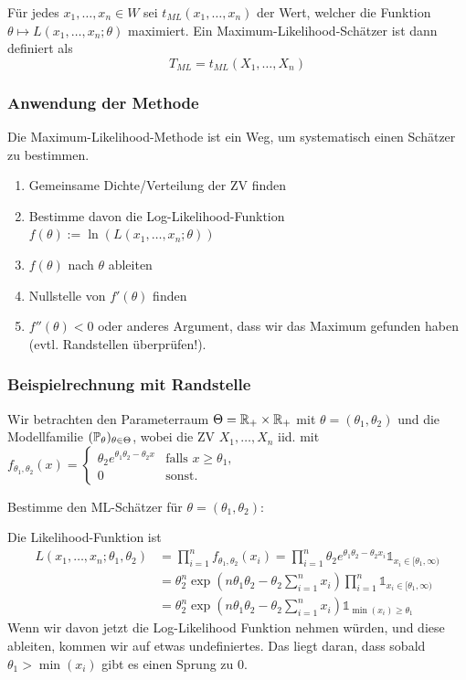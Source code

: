 \noindent Für jedes \(x_1, \ldots, x_n \in W\) sei \(t_{ML}(x_1, \ldots, x_n)\) der Wert, welcher die Funktion \(\theta \mapsto L(x_1, \ldots, x_n; \theta)\) maximiert. Ein Maximum-Likelihood-Schätzer ist dann definiert als
\[T_{ML} = t_{ML}(X_1, \ldots, X_n)\]

\subsubsection{Anwendung der Methode}
Die Maximum-Likelihood-Methode ist ein Weg, um systematisch einen Schätzer zu bestimmen.
\begin{enumerate}
	\item Gemeinsame Dichte/Verteilung der ZV finden
	\item Bestimme davon die Log-Likelihood-Funktion\\ \(f(\theta) := \ln(L(x_1, \ldots, x_n;\theta))\)
	\item \(f(\theta)\) nach \(\theta\) ableiten
	\item Nullstelle von \(f'(\theta)\) finden
	\item $f''(\theta) < 0$ oder anderes Argument, dass wir das Maximum gefunden haben (evtl. Randstellen überprüfen!).
\end{enumerate}

\subsubsection*{Beispielrechnung mit Randstelle}
Wir betrachten den Parameterraum $\Theta = \R_+ \times \R_+$ mit $\theta = (\theta_1, \theta_2)$ und die Modellfamilie $(\P_\theta)_{\theta\in \Theta}$, wobei die ZV $X_1, \ldots, X_n$ iid. mit $f_{\theta_1, \theta_2}(x) = \begin{cases}
    \theta_2e^{\theta_1\theta_2 - \theta_2x} & \text{falls }x \geq \theta_1,\\
    0 & \text{sonst.}
\end{cases}$

Bestimme den ML-Schätzer für $\theta = (\theta_1, \theta_2)$:

Die Likelihood-Funktion ist 
\begin{align*}
    L(x_1, \dots, x_n; \theta_1, \theta_2) &= \prod_{i = 1}^{n}f_{\theta_1, \theta_2}(x_i) = \prod_{i = 1}^n \theta_2e^{\theta_1\theta_2 - \theta_2 x_i} \mathds{1}_{x_i \in [\theta_1, \infty)}\\
    &= \theta_2^n \exp\left(n\theta_1\theta_2 - \theta_2 \sum_{i=1}^n x_i\right) \prod_{i=1}^n \mathds{1}_{x_i \in [\theta_1, \infty)}\\
    &= \theta_2^n \exp\left(n\theta_1\theta_2 - \theta_2 \sum_{i=1}^n x_i\right) \mathds{1}_{\min(x_i) \geq \theta_1}
\end{align*}
Wenn wir davon jetzt die Log-Likelihood Funktion nehmen würden, und diese ableiten, kommen wir auf etwas undefiniertes. 
Das liegt daran, dass sobald $\theta_1 > \min(x_i)$ gibt es einen Sprung zu $0$.

